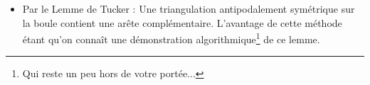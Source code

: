 \documentclass{cours}
\begin{document}
\begin{itemize}
\begin{proof}
              \begin{equation*}
                  \rho(1) = \rho \left(\frac{1}{2} \right) + \frac{c}{2} = \left(\rho(0) + \frac{c}{2} \right) + \frac{c}{2} = c
              \end{equation*}
              Donc $\rho(1)$ est impair, différent de $0$. En particulier, $g_{*}\alpha$ n'est pas homotope à un point, et fait $c$ tours autour du cercle. Ainsi, l'image de $g_{*}$ est différente de l'élément neutre, mais $g_{*}$ est un morphisme du groupe trivial dans un groupe isomorphe à $\mathbb{Z}$, ce qui conclut le raisonnement par l'absurde.
          \end{proof}
    \item Par le Lemme de Tucker : Une triangulation antipodalement symétrique sur la boule contient une arête complémentaire. L'avantage de cette méthode étant qu'on connaît une démonstration algorithmique\footnote{Qui reste un peu hors de votre portée...} de ce lemme.
\end{itemize}
\end{document}

